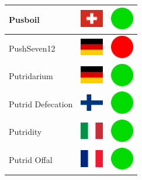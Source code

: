 \documentclass[12pt, a4paper, twoside]{report}
\begin{document}
\begin{center}
\begin{longtable}{|p{5cm}|p{2cm}|p{2cm}|}
 Pusboil                                                    & \includegraphics[width=1cm]{../img/flags/ch} &   \includegraphics[width=1cm]{../likes/y} \\ \hline
 PushSeven12                                                & \includegraphics[width=1cm]{../img/flags/de} &   \includegraphics[width=1cm]{../likes/n} \\ \hline
 Putridarium                                                & \includegraphics[width=1cm]{../img/flags/de} &   \includegraphics[width=1cm]{../likes/y} \\ \hline
 Putrid Defecation                                          & \includegraphics[width=1cm]{../img/flags/fi} &   \includegraphics[width=1cm]{../likes/y} \\ \hline
 Putridity                                                  & \includegraphics[width=1cm]{../img/flags/it} &   \includegraphics[width=1cm]{../likes/y} \\ \hline
 Putrid Offal                                               & \includegraphics[width=1cm]{../img/flags/fr} &   \includegraphics[width=1cm]{../likes/y} \\ \hline

\end{longtable}
\end{center}
\end{document}
